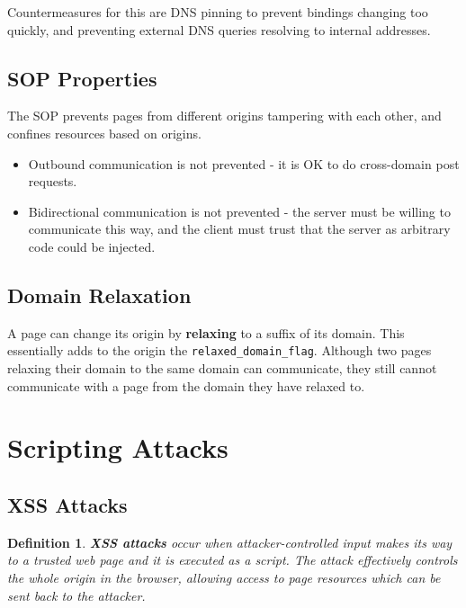 \documentclass[11pt]{article}
\newtheorem{defn}{Definition}
\begin{document}
Countermeasures for this are DNS pinning to prevent bindings changing too quickly, and preventing external DNS queries resolving to internal addresses.

\subsection{SOP Properties}
The SOP prevents pages from different origins tampering with each other, and confines resources based on origins.
\begin{itemize}
  \item Outbound communication is not prevented - it is OK to do cross-domain post requests.
  \item Bidirectional communication is not prevented - the server must be willing to communicate this way, and the client must trust that the server as arbitrary code could be injected.
\end{itemize}

\subsection{Domain Relaxation}
A page can change its origin by \textbf{relaxing} to a suffix of its domain.
This essentially adds to the origin the \texttt{relaxed\_domain\_flag}.
Although two pages relaxing their domain to the same domain can communicate, they still cannot communicate with a page from the domain they have relaxed to.

\section{Scripting Attacks}
\subsection{XSS Attacks}
\begin{defn}
  \textbf{XSS attacks} occur when attacker-controlled input makes its way to a trusted web page and it is executed as a script.
  The attack effectively controls the whole origin in the browser, allowing access to page resources which can be sent back to the attacker.
\end{defn}
\end{document}
